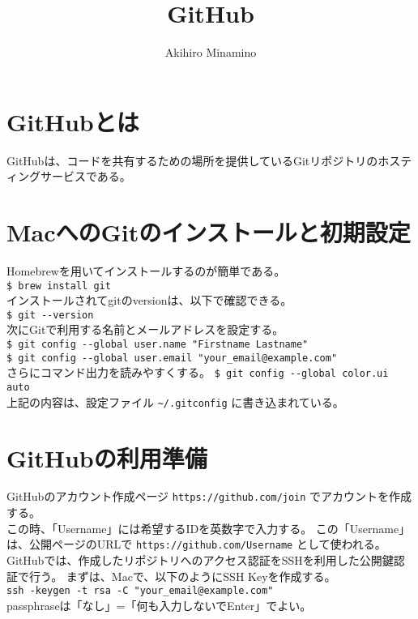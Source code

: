 \documentclass[11pt, oneside]{article}   	%
\title{GitHub}
\author{Akihiro Minamino}
\begin{document}
\maketitle
\section{GitHubとは}
GitHubは、コードを共有するための場所を提供しているGitリポジトリのホスティングサービスである。\\

\section{MacへのGitのインストールと初期設定}
Homebrewを用いてインストールするのが簡単である。\\
\verb|$ brew install git|\\
インストールされてgitのversionは、以下で確認できる。\\
\verb|$ git --version|\\


次にGitで利用する名前とメールアドレスを設定する。\\
\verb|$ git config --global user.name "Firstname Lastname"|\\
\verb|$ git config --global user.email "your_email@example.com"|\\
さらにコマンド出力を読みやすくする。
\verb|$ git config --global color.ui auto|\\
上記の内容は、設定ファイル \verb|~/.gitconfig| に書き込まれている。\\

\section{GitHubの利用準備}
GitHubのアカウント作成ページ \verb|https://github.com/join| でアカウントを作成する。\\
この時、「Username」には希望するIDを英数字で入力する。
この「Username」は、公開ページのURLで \verb|https://github.com/Username| として使われる。\\

GitHubでは、作成したリポジトリへのアクセス認証をSSHを利用した公開鍵認証で行う。
まずは、Macで、以下のようにSSH Keyを作成する。\\
\verb|ssh -keygen -t rsa -C "your_email@example.com"|\\
passphraseは「なし」=「何も入力しないでEnter」でよい。\\
\end{document}
